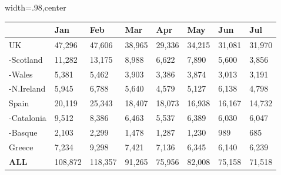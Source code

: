 \begin{table}[ht]
\centering
\begin{subtable}{\textwidth}
\centering
\begin{adjustbox}{width=.98\textwidth,center}
\begin{tabular}{|l|l|l|l|l|l|l|l|}
\hline
             & Jan & Feb & Mar & Apr & May   & Jun  & Jul  \\ \hline
UK           & 47,296 & 47,606 & 38,965 & 29,336 & 34,215 & 31,081 & 31,970 \\ \hline
-Scotland    & 11,282 & 13,175 & 8,988  & 6,622  & 7,890  & 5,600  & 3,856  \\ \hline
-Wales       & 5,381  & 5,462  & 3,903  & 3,386  & 3,874  & 3,013  & 3,191  \\ \hline
-N.Ireland   & 5,945  & 6,788  & 5,640  & 4,579  & 5,127  & 6,138  & 4,798  \\ \hline
Spain        & 20,119 & 25,343 & 18,407 & 18,073 & 16,938 & 16,167 & 14,732 \\ \hline
-Catalonia   & 9,512  & 8,386  & 6,463  & 5,537  & 6,389  & 6,030  & 6,047  \\ \hline
-Basque      & 2,103  & 2,299  & 1,478  & 1,287  & 1,230  & 989    & 685    \\ \hline
Greece       & 7,234  & 9,298  & 7,421  & 7,136  & 6,345  & 6,140  & 6,239  \\ \hline
\textbf{ALL} & 108,872& 118,357& 91,265 & 75,956 & 82,008 &75,158 & 71,518 \\ \hline
\end{tabular}
\end{adjustbox}
\end{subtable}

\vspace{0.7em}


\end{table}
